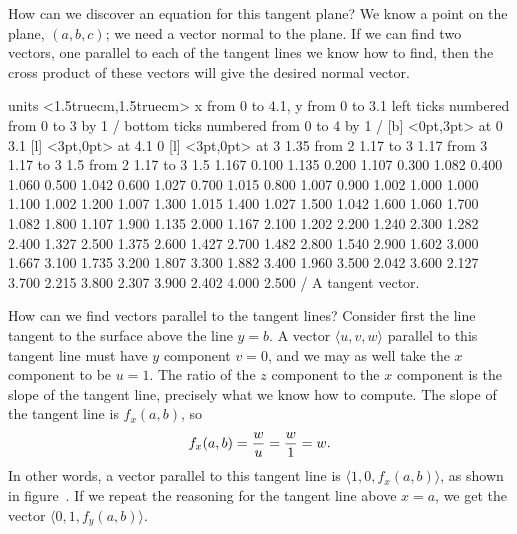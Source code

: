 How can we discover an equation for this tangent plane? We know a
point on the plane, $(a,b,c)$; we need a vector normal to the
plane. If we can find two vectors, one parallel to each of the tangent
lines we know how to find, then the cross product of these vectors
will give the desired normal vector.

\figure
\texonly
\vbox{\beginpicture
\normalgraphs
\ninepoint
\setcoordinatesystem units <1.5truecm,1.5truecm>
\setplotarea x from 0 to 4.1, y from 0 to 3.1
\axis left ticks numbered from 0 to 3 by 1 /
\axis bottom ticks numbered from 0 to 4 by 1 /
 [b] <0pt,3pt> at 0 3.1
 [l] <3pt,0pt> at 4.1 0
 [l] <3pt,0pt> at 3 1.35
\putrule from 2 1.17 to 3 1.17
\putrule from 3 1.17 to 3 1.5
\setlinear
\arrow <5pt> [0.17, 0.5] from 2 1.17 to 3 1.5
\setquadratic
{} 1.167 0.100 1.135 0.200 1.107 0.300 1.082 0.400 1.060 
0.500 1.042 0.600 1.027 0.700 1.015 0.800 1.007 0.900 1.002 
1.000 1.000 1.100 1.002 1.200 1.007 1.300 1.015 1.400 1.027 
1.500 1.042 1.600 1.060 1.700 1.082 1.800 1.107 1.900 1.135 
2.000 1.167 2.100 1.202 2.200 1.240 2.300 1.282 2.400 1.327 
2.500 1.375 2.600 1.427 2.700 1.482 2.800 1.540 2.900 1.602 
3.000 1.667 3.100 1.735 3.200 1.807 3.300 1.882 3.400 1.960 
3.500 2.042 3.600 2.127 3.700 2.215 3.800 2.307 3.900 2.402 
4.000 2.500 /
\endpicture}
\endtexonly
{}
\begincaption
A tangent vector.
\endcaption
\endfigure

How can we find vectors parallel to the tangent lines? Consider first
the line tangent to the surface above the line $y=b$. A vector
$\langle u,v,w\rangle$ parallel to this tangent line must have $y$
component $v=0$, and we may as well take the $x$ component to be
$u=1$. The ratio of the $z$ component to the $x$ component is the
slope of the tangent line, precisely what we know how to compute. The
slope of the tangent line is $f_x(a,b)$, so
$$ f_x(a,b)={w\over u} ={w\over1} = w.$$
In other words, a vector parallel to this tangent line is
$\langle 1,0,f_x(a,b)\rangle$, as shown in figure~. 
If we repeat the reasoning for the
tangent line above $x=a$, we get the vector $\langle
0,1,f_y(a,b)\rangle$.


